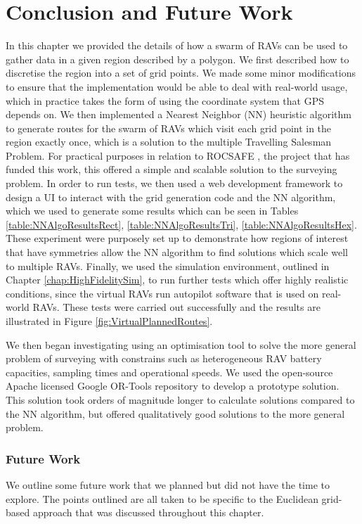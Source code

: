 \section{Conclusion and Future Work}\label{sec:SurveyingConclusionFutureWork}
In this chapter we provided the details of how a swarm of RAVs can be used to gather data in a given region described by a polygon. We first described how to discretise the region into a set of grid points. We made some minor modifications to ensure that the implementation would be able to deal with real-world usage, which in practice takes the form of using the coordinate system that GPS depends on. We then implemented a Nearest Neighbor (NN) heuristic algorithm to generate routes for the swarm of RAVs which visit each grid point in the region exactly once, which is a solution to the multiple Travelling Salesman Problem. For practical purposes in relation to ROCSAFE \cite{Bagherzadeh2017ROCSAFE:Incidents}, the project that has funded this work, this offered a simple and scalable solution to the surveying problem. In order to run tests, we then used a web development framework to design a UI to interact with the grid generation code and the NN algorithm, which we used to generate some results which can be seen in Tables \ref{table:NNAlgoResultsRect}, \ref{table:NNAlgoResultsTri}, \ref{table:NNAlgoResultsHex}. These experiment were purposely set up to demonstrate how regions of interest that have symmetries allow the NN algorithm to find solutions which scale well to multiple RAVs. %
Finally, we used the simulation environment, outlined in Chapter \ref{chap:HighFidelitySim}, to run further tests which offer highly realistic conditions, since the virtual RAVs run autopilot software that is used on real-world RAVs. These tests were carried out successfully and the results are illustrated in Figure \ref{fig:VirtualPlannedRoutes}. 

We then began investigating using an optimisation tool to solve the more general problem of surveying with constrains such as heterogeneous RAV battery capacities, sampling times and operational speeds. We used the open-source Apache licensed Google OR-Tools repository to develop a prototype solution. This solution took orders of magnitude longer to calculate solutions compared to the NN algorithm, but offered qualitatively good solutions to the more general problem.



\subsubsection{Future Work}
We outline some future work that we planned but did not have the time to explore. The points outlined are all taken to be specific to the Euclidean grid-based approach that was discussed throughout this chapter.

